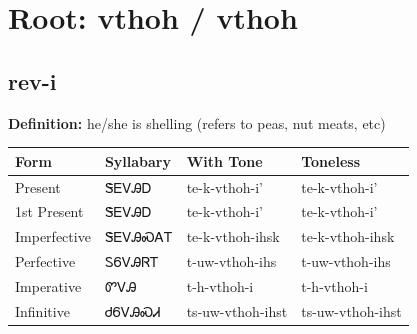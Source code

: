 \documentclass{article}%
\begin{document}
%
\normalsize%
\section*{Root: vthoh / vthoh}%
\subsection*{rev-i}%
\textbf{Definition: }%
he/she is shelling (refers to peas‚ nut meats‚ etc)%
\\[0.5em]%
\begin{tabular}{|l|l|l|l|}%
\hline%
\textbf{Form}&\textbf{Syllabary}&\textbf{With Tone}&\textbf{Toneless}\\%
\hline%
Present&ᏕᎬᏙᎯᎠ&te{-}k{-}vthoh{-}i'&te{-}k{-}vthoh{-}i'\\%
1st Present&ᏕᎬᏙᎯᎠ&te{-}k{-}vthoh{-}i'&te{-}k{-}vthoh{-}i'\\%
Imperfective&ᏕᎬᏙᎯᏍᎪᎢ&te{-}k{-}vthoh{-}ihsk&te{-}k{-}vthoh{-}ihsk\\%
Perfective&ᏚᏮᏙᎯᏒᎢ&t{-}uw{-}vthoh{-}ihs&t{-}uw{-}vthoh{-}ihs\\%
Imperative&ᏛᏙᎯ&t{-}h{-}vthoh{-}i&t{-}h{-}vthoh{-}i\\%
Infinitive&ᏧᏮᏙᎯᏍᏗ&ts{-}uw{-}vthoh{-}ihst&ts{-}uw{-}vthoh{-}ihst\\%
\hline%
\end{tabular}%
\\[1em]%
\end{document}
